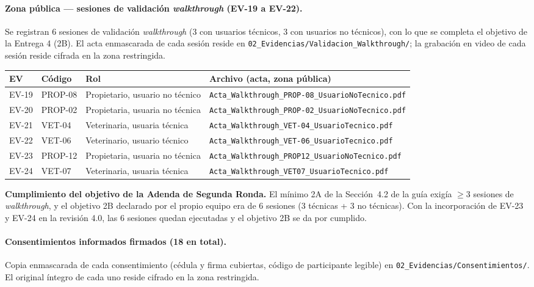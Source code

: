 \documentclass[journal,onecolumn]{IEEEtran}
\begin{document}
	\paragraph{Zona pública --- sesiones de validación \emph{walkthrough} (EV-19 a EV-22).}
	Se registran 6 sesiones de validación \emph{walkthrough} (3 con usuarios
	técnicos, 3 con usuarios no técnicos), con lo que se completa el objetivo
	de la Entrega 4 (2B). El acta enmascarada de cada sesión reside en
	\texttt{02\_Evidencias/Validacion\_Walkthrough/}; la grabación en video de
	cada sesión reside cifrada en la zona restringida.
	
	\begin{table}[H]
		\centering
		\small
		\begin{tabularx}{\textwidth}{@{}l l X X@{}}
			\toprule
			\textbf{EV} & \textbf{Código} & \textbf{Rol} & \textbf{Archivo (acta, zona pública)} \\
			\midrule
			EV-19 & PROP-08 & Propietario, usuario no técnico & \texttt{Acta\_Walkthrough\_PROP-08\_UsuarioNoTecnico.pdf} \\
			EV-20 & PROP-02 & Propietaria, usuaria no técnica & \texttt{Acta\_Walkthrough\_PROP-02\_UsuarioNoTecnico.pdf} \\
			EV-21 & VET-04 & Veterinaria, usuaria técnica & \texttt{Acta\_Walkthrough\_VET-04\_UsuarioTecnico.pdf} \\
			EV-22 & VET-06 & Veterinario, usuario técnico & \texttt{Acta\_Walkthrough\_VET-06\_UsuarioTecnico.pdf} \\
			EV-23 & PROP-12 & Propietaria, usuaria no técnica & \texttt{Acta\_Walkthrough\_PROP12\_UsuarioNoTecnico.pdf} \\
			EV-24 & VET-07 & Veterinaria, usuaria técnica & \texttt{Acta\_Walkthrough\_VET07\_UsuarioTecnico.pdf} \\
			\bottomrule
		\end{tabularx}
	\end{table}
	
	\textbf{Cumplimiento del objetivo de la Adenda de Segunda Ronda.} El mínimo
	2A de la Sección~4.2 de la guía exigía $\geq 3$ sesiones de
	\emph{walkthrough}, y el objetivo 2B declarado por el propio equipo era de
	6 sesiones (3 técnicas + 3 no técnicas). Con la incorporación de EV-23 y
	EV-24 en la revisión 4.0, las 6 sesiones quedan ejecutadas y el objetivo
	2B se da por cumplido.
	
	\paragraph{Consentimientos informados firmados (18 en total).}
	Copia enmascarada de cada consentimiento (cédula y firma cubiertas, código
	de participante legible) en \texttt{02\_Evidencias/Consentimientos/}. El
	original íntegro de cada uno reside cifrado en la zona restringida.
	
\end{document}
